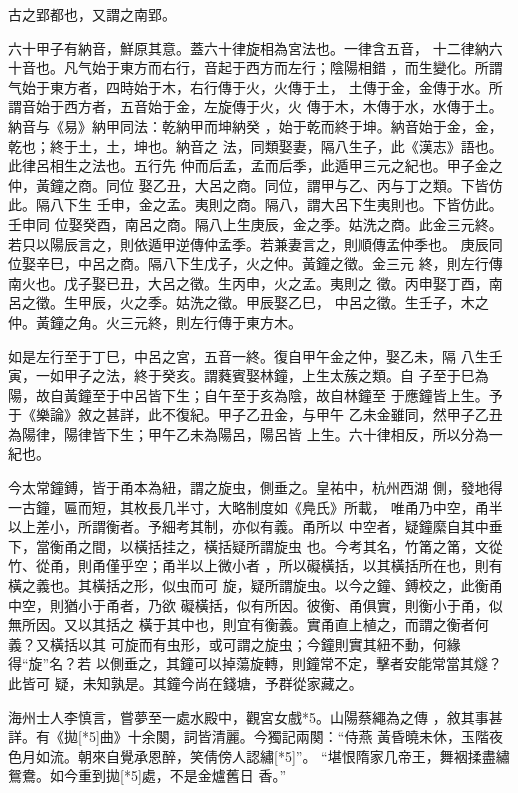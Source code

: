 \documentclass{ctexart}
\begin{document}
古之郢都也，又謂之南郢。

六十甲子有納音，鮮原其意。蓋六十律旋相為宮法也。一律含五音， 十二律納六十音也。凡气始于東方而右行，音起于西方而左行；陰陽相錯 ，而生變化。所謂气始于東方者，四時始于木，右行傳于火，火傳于土， 土傳于金，金傳于水。所謂音始于西方者，五音始于金，左旋傳于火，火 傳于木，木傳于水，水傳于土。納音与《易》納甲同法：乾納甲而坤納癸 ，始于乾而終于坤。納音始于金，金，乾也；終于土，土，坤也。納音之 法，同類娶妻，隔八生子，此《漢志》語也。此律呂相生之法也。五行先 仲而后孟，孟而后季，此遁甲三元之紀也。甲子金之仲，黃鐘之商。同位 娶乙丑，大呂之商。同位，謂甲与乙、丙与丁之類。下皆仿此。隔八下生 壬申，金之孟。夷則之商。隔八，謂大呂下生夷則也。下皆仿此。壬申同 位娶癸酉，南呂之商。隔八上生庚辰，金之季。姑洗之商。此金三元終。 若只以陽辰言之，則依遁甲逆傳仲孟季。若兼妻言之，則順傳孟仲季也。 庚辰同位娶辛巳，中呂之商。隔八下生戊子，火之仲。黃鐘之徵。金三元 終，則左行傳南火也。戊子娶已丑，大呂之徵。生丙申，火之孟。夷則之 徵。丙申娶丁酉，南呂之徵。生甲辰，火之季。姑洗之徵。甲辰娶乙巳， 中呂之徵。生壬子，木之仲。黃鐘之角。火三元終，則左行傳于東方木。

如是左行至于丁巳，中呂之宮，五音一終。復自甲午金之仲，娶乙未，隔 八生壬寅，一如甲子之法，終于癸亥。謂蕤賓娶林鐘，上生太蔟之類。自 子至于巳為陽，故自黃鐘至于中呂皆下生；自午至于亥為陰，故自林鐘至 于應鐘皆上生。予于《樂論》敘之甚詳，此不復紀。甲子乙丑金，与甲午 乙未金雖同，然甲子乙丑為陽律，陽律皆下生；甲午乙未為陽呂，陽呂皆 上生。六十律相反，所以分為一紀也。

今太常鐘鎛，皆于甬本為紐，謂之旋虫，側垂之。皇祐中，杭州西湖 側，發地得一古鐘，匾而短，其枚長几半寸，大略制度如《鳧氏》所載， 唯甬乃中空，甬半以上差小，所謂衡者。予細考其制，亦似有義。甬所以 中空者，疑鐘縻自其中垂下，當衡甬之間，以橫括挂之，橫括疑所謂旋虫 也。今考其名，竹筩之筩，文從竹、從甬，則甬僅乎空；甬半以上微小者 ，所以礙橫括，以其橫括所在也，則有橫之義也。其橫括之形，似虫而可 旋，疑所謂旋虫。以今之鐘、鎛校之，此衡甬中空，則猶小于甬者，乃欲 礙橫括，似有所因。彼衡、甬俱實，則衡小于甬，似無所因。又以其括之 橫于其中也，則宜有衡義。實甬直上植之，而謂之衡者何義？又橫括以其 可旋而有虫形，或可謂之旋虫；今鐘則實其紐不動，何緣得``旋''名？若 以側垂之，其鐘可以掉蕩旋轉，則鐘常不定，擊者安能常當其燧？此皆可 疑，未知孰是。其鐘今尚在錢塘，予群從家藏之。

海州士人李慎言，嘗夢至一處水殿中，觀宮女戲*5。山陽蔡繩為之傳 ，敘其事甚詳。有《拋[*5]曲》十余闋，詞皆清麗。今獨記兩闋：``侍燕 黃昏曉未休，玉階夜色月如流。朝來自覺承恩醉，笑倩傍人認繡[*5]''。 ``堪恨隋家几帝王，舞裀揉盡繡鴛鴦。如今重到拋[*5]處，不是金爐舊日 香。''
\end{document}
